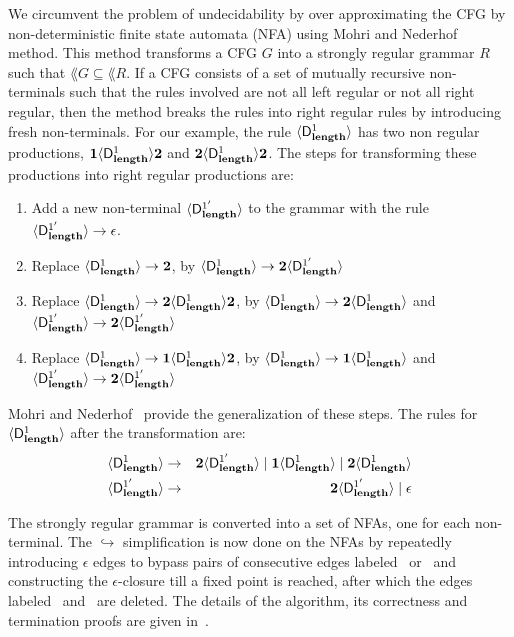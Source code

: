 We circumvent the problem of  undecidability by over approximating the
CFG by non-deterministic finite state automata (NFA) using
Mohri   and   Nederhof~\cite{mohri00regular}   method.   This   method
transforms a CFG $G$ into a strongly  regular grammar $R$ such that $\lang{G} \subseteq \lang{R}$. 
If a CFG consists of a set of mutually recursive non-terminals such that the rules involved are not all left regular or not all right regular, then the method breaks the rules into right regular rules by introducing fresh non-terminals. For our example, the rule  $\langle \mathsf{D}_{\mathit {\mathbf{length}}}^{1}\rangle$ has two non regular productions,           $\mathbf{1}\langle \mathsf{D}_{\mathit {\mathbf{length}}}^{1}\rangle{\mathbf{2}}$          and
${\mathbf{2}}\langle \mathsf{D}_{\mathit {\mathbf{length}}}^{1}\rangle{\ensuremath{{\mathbf{2}}}}$.  The steps for transforming these productions into
right regular productions are:

\begin{enumerate}
\item
Add a  new non-terminal  $\langle \mathsf{D}_{\mathit {\mathbf{length}}}^{1'}\rangle$ to the  grammar with
the rule $\langle \mathsf{D}_{\mathit {\mathbf{length}}}^{1'}\rangle \rightarrow \epsilon$.
\item
 Replace     $\langle \mathsf{D}_{\mathit {\mathbf{length}}}^{1}\rangle     \rightarrow     {\mathbf{2}}$,     by
 $\langle \mathsf{D}_{\mathit {\mathbf{length}}}^{1}\rangle \rightarrow {\mathbf{2}}\langle \mathsf{D}_{\mathit {\mathbf{length}}}^{1'}\rangle$
\item
 Replace
 $\langle \mathsf{D}_{\mathit {\mathbf{length}}}^{1}\rangle \rightarrow {\mathbf{2}}\langle \mathsf{D}_{\mathit {\mathbf{length}}}^{1}\rangle{\mathbf{2}}$,
 by  $\langle \mathsf{D}_{\mathit {\mathbf{length}}}^{1}\rangle  \rightarrow  {\mathbf{2}}\langle \mathsf{D}_{\mathit {\mathbf{length}}}^{1}\rangle$
 and $\langle \mathsf{D}_{\mathit {\mathbf{length}}}^{1'}\rangle \rightarrow {\mathbf{2}}\langle \mathsf{D}_{\mathit {\mathbf{length}}}^{1'}\rangle$
\item
  Replace
 $\langle \mathsf{D}_{\mathit {\mathbf{length}}}^{1}\rangle \rightarrow \mathbf{1}\langle \mathsf{D}_{\mathit {\mathbf{length}}}^{1}\rangle{\mathbf{2}}$,
 by $\langle \mathsf{D}_{\mathit {\mathbf{length}}}^{1}\rangle \rightarrow \mathbf{1}\langle \mathsf{D}_{\mathit {\mathbf{length}}}^{1}\rangle$ and
 $\langle \mathsf{D}_{\mathit {\mathbf{length}}}^{1'}\rangle \rightarrow {\mathbf{2}}\langle \mathsf{D}_{\mathit {\mathbf{length}}}^{1'}\rangle$
\end{enumerate}

Mohri and Nederhof~\cite{mohri00regular} provide the generalization of
these  steps.  The  rules for  
$\langle \mathsf{D}_{\mathit {\mathbf{length}}}^{1}\rangle$ after the transformation are:
\begin{eqnarray*}              
  \langle \mathsf{D}_{\mathit {\mathbf{length}}}^{1}\rangle   &\rightarrow&   {\mathbf{2}}\langle \mathsf{D}_{\mathit {\mathbf{length}}}^{1'}\rangle
  \mid                 \mathbf{1}\langle \mathsf{D}_{\mathit {\mathbf{length}}}^{1}\rangle                 \mid
  {\mathbf{2}}\langle \mathsf{D}_{\mathit {\mathbf{length}}}^{1}\rangle\\  \langle \mathsf{D}_{\mathit {\mathbf{length}}}^{1'}\rangle  &\rightarrow&
  {\mathbf{2}}\langle \mathsf{D}_{\mathit {\mathbf{length}}}^{1'}\rangle \mid \epsilon
\end{eqnarray*}



The strongly regular grammar is converted  into a set of NFAs, one for
each non-terminal.  The  $\hookrightarrow$ simplification is now
done on the NFAs by  repeatedly introducing $\epsilon$ edges to bypass
pairs  of consecutive  edges  labeled \bcar\acar\  or \bcdr\acdr\  and
constructing  the $\epsilon$-closure  till a  fixed point  is reached,
after which  the edges labeled  \bcar \  and \bcdr\ are  deleted.  The
details of the  algorithm, its correctness and  termination proofs are
given in~\cite{karkare07liveness,asati14lgc}.

